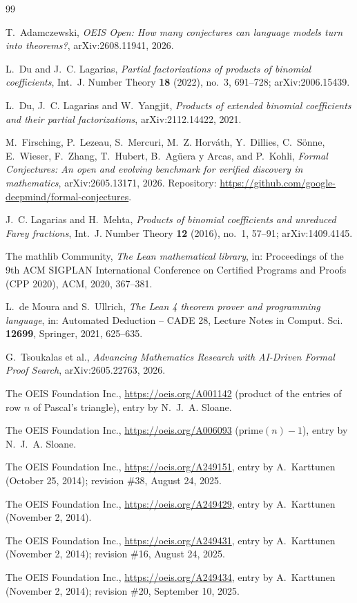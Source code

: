 \documentclass[11pt]{amsart}
\theoremstyle{plain}
\theoremstyle{definition}
\begin{document}
{\small
\begin{thebibliography}{99}

T.~Adamczewski, \emph{OEIS Open: How many conjectures can language models turn into theorems?}, arXiv:2608.11941, 2026.

L.~Du and J.~C. Lagarias, \emph{Partial factorizations of products of binomial coefficients}, Int.\ J. Number Theory \textbf{18} (2022), no.~3, 691--728; arXiv:2006.15439.

L.~Du, J.~C. Lagarias and W.~Yangjit, \emph{Products of extended binomial coefficients and their partial factorizations}, arXiv:2112.14422, 2021.

M.~Firsching, P.~Lezeau, S.~Mercuri, M.~Z. Horv\'ath, Y.~Dillies, C.~S\"onne, E.~Wieser, F.~Zhang, T.~Hubert, B.~Ag\"uera y Arcas, and P.~Kohli, \emph{Formal Conjectures: An open and evolving benchmark for verified discovery in mathematics}, arXiv:2605.13171, 2026. Repository: \url{https://github.com/google-deepmind/formal-conjectures}.

J.~C. Lagarias and H.~Mehta, \emph{Products of binomial coefficients and unreduced Farey fractions}, Int.\ J. Number Theory \textbf{12} (2016), no.~1, 57--91; arXiv:1409.4145.

The mathlib Community, \emph{The Lean mathematical library}, in: Proceedings of the 9th ACM SIGPLAN International Conference on Certified Programs and Proofs (CPP 2020), ACM, 2020, 367--381.

L.~de Moura and S.~Ullrich, \emph{The Lean 4 theorem prover and programming language}, in: Automated Deduction -- CADE 28, Lecture Notes in Comput. Sci. \textbf{12699}, Springer, 2021, 625--635.

G.~Tsoukalas et al., \emph{Advancing Mathematics Research with AI-Driven Formal Proof Search}, arXiv:2605.22763, 2026.

The OEIS Foundation Inc., \url{https://oeis.org/A001142} (product of the entries of row $n$ of Pascal's triangle), entry by N.~J.~A. Sloane.

The OEIS Foundation Inc., \url{https://oeis.org/A006093} ($\mathrm{prime}(n)-1$), entry by N.~J.~A. Sloane.

The OEIS Foundation Inc., \url{https://oeis.org/A249151}, entry by A.~Karttunen (October 25, 2014); revision \#38, August 24, 2025.

The OEIS Foundation Inc., \url{https://oeis.org/A249429}, entry by A.~Karttunen (November 2, 2014).

The OEIS Foundation Inc., \url{https://oeis.org/A249431}, entry by A.~Karttunen (November 2, 2014); revision \#16, August 24, 2025.

The OEIS Foundation Inc., \url{https://oeis.org/A249434}, entry by A.~Karttunen (November 2, 2014); revision \#20, September 10, 2025.

\end{thebibliography}
}
\end{document}
